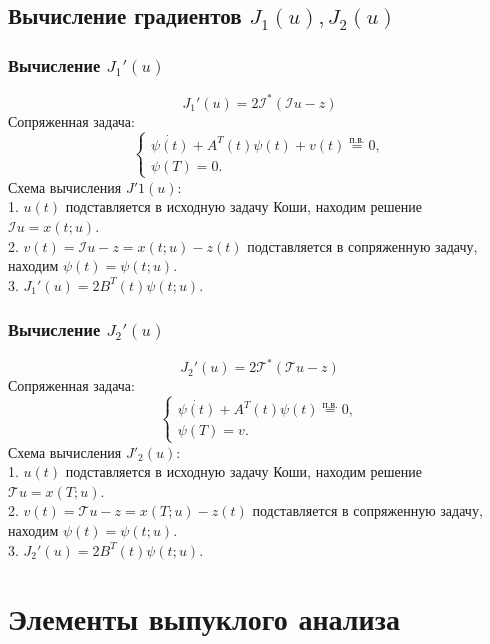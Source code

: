 \documentclass[A4]{article}
\begin{document}
\subsection{Вычисление градиентов $J_1(u),J_2(u)$}
\subsubsection{Вычисление $J_1'(u)$}
\begin{equation*}
J_1'(u)=2\mathcal{I}^{*}(\mathcal{I}u-z)
\end{equation*}
Сопряженная задача:
\begin{equation*}
\left\{\begin{array}{l}
\dot{\psi(t)}+A^T(t)\psi(t)+v(t)\stackrel{\text{п.в.}}{=}0,\\
\psi(T)=0.
\end{array}\right.
\end{equation*}
Схема вычисления $J'1(u)$:\\
1. $u(t)$ подставляется в исходную задачу Коши, находим решение $\mathcal{I}u=x(t;u)$.\\
2. $v(t)=\mathcal{I}u-z=x(t;u)-z(t)$ подставляется в сопряженную задачу, находим $\psi(t)=\psi(t;u)$.\\
3. $J_1'(u)=2B^T(t)\psi(t;u)$.
\subsubsection{Вычисление $J_2'(u)$}
\begin{equation*}
J_2'(u)=2\mathcal{T}^{*}(\mathcal{T}u-z)
\end{equation*}
Сопряженная задача:
\begin{equation*}
\left\{\begin{array}{l}
\dot{\psi(t)}+A^T(t)\psi(t)\stackrel{\text{п.в.}}{=}0,\\
\psi(T)=v.
\end{array}\right.
\end{equation*}
Схема вычисления $J'_2(u)$:\\
1. $u(t)$ подставляется в исходную задачу Коши, находим решение $\mathcal{T}u=x(T;u)$.\\
2. $v(t)=\mathcal{T}u-z=x(T;u)-z(t)$ подставляется в сопряженную задачу, находим $\psi(t)=\psi(t;u)$.\\
3. $J_2'(u)=2B^T(t)\psi(t;u)$.
\section{Элементы выпуклого анализа}
\end{document}
